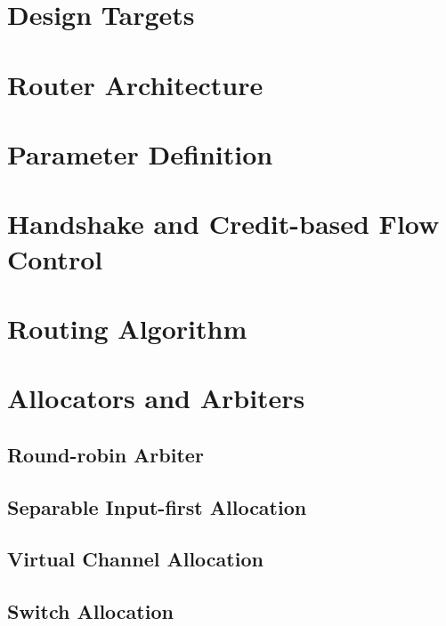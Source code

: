 \label{ch3:design_and_implementation}

\section{Design Targets}

\section{Router Architecture}

\section{Parameter Definition}

\section{Handshake and Credit-based Flow Control}

\section{Routing Algorithm}

\section{Allocators and Arbiters}

\subsection{Round-robin Arbiter}

\subsection{Separable Input-first Allocation}

\subsection{Virtual Channel Allocation}

\subsection{Switch Allocation}


